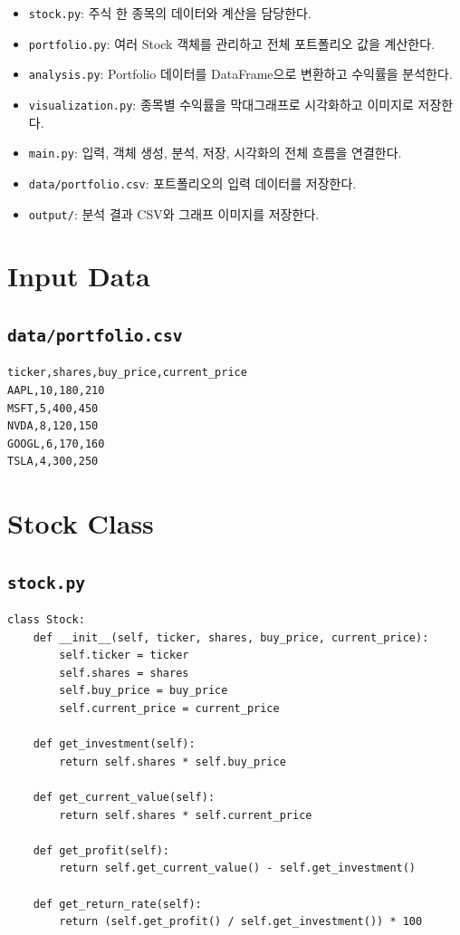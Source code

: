\documentclass[11pt,a4paper]{article}
\begin{document}
\begin{itemize}[leftmargin=1.5em]
    \item \texttt{stock.py}: 주식 한 종목의 데이터와 계산을 담당한다.
    \item \texttt{portfolio.py}: 여러 Stock 객체를 관리하고 전체 포트폴리오 값을 계산한다.
    \item \texttt{analysis.py}: Portfolio 데이터를 DataFrame으로 변환하고 수익률을 분석한다.
    \item \texttt{visualization.py}: 종목별 수익률을 막대그래프로 시각화하고 이미지로 저장한다.
    \item \texttt{main.py}: 입력, 객체 생성, 분석, 저장, 시각화의 전체 흐름을 연결한다.
    \item \texttt{data/portfolio.csv}: 포트폴리오의 입력 데이터를 저장한다.
    \item \texttt{output/}: 분석 결과 CSV와 그래프 이미지를 저장한다.
\end{itemize}

\section{Input Data}

\subsection{\texttt{data/portfolio.csv}}

\begin{lstlisting}[language={}]
ticker,shares,buy_price,current_price
AAPL,10,180,210
MSFT,5,400,450
NVDA,8,120,150
GOOGL,6,170,160
TSLA,4,300,250
\end{lstlisting}

\section{Stock Class}

\subsection{\texttt{stock.py}}

\begin{lstlisting}
class Stock:
    def __init__(self, ticker, shares, buy_price, current_price):
        self.ticker = ticker
        self.shares = shares
        self.buy_price = buy_price
        self.current_price = current_price

    def get_investment(self):
        return self.shares * self.buy_price

    def get_current_value(self):
        return self.shares * self.current_price

    def get_profit(self):
        return self.get_current_value() - self.get_investment()

    def get_return_rate(self):
        return (self.get_profit() / self.get_investment()) * 100
\end{lstlisting}
\end{document}
